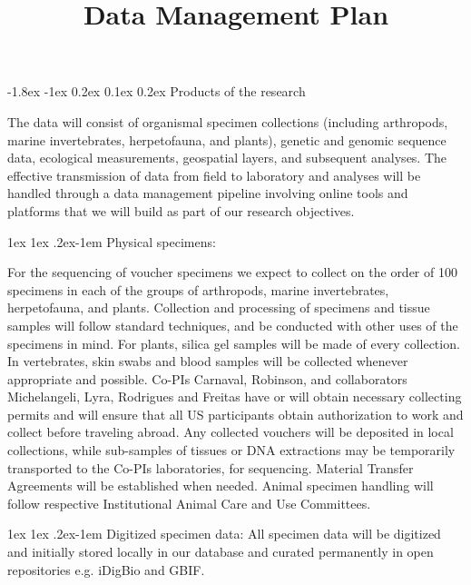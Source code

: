 \documentclass[11pt]{article}
\title{Data Management Plan \vspace{-1.5ex}}
\author{}
\date{}
\makeatletter
\renewcommand\section{\@startsection{section}{1}{\z@}%
                                  {-1.8ex \@plus -1ex \@minus 0.2ex}%
                                  {0.1ex \@plus 0.2ex}%
                                  {\normalfont\Large\bfseries}}
\renewcommand{\paragraph}{\@startsection{paragraph}{4}{\z@}
  {1ex \@plus 1ex \@minus .2ex}{-1em}
  {\normalfont\normalsize\bf}
}
\makeatother
\begin{document}
\maketitle
\vspace{-6em}

\section{Products of the research} 

The data will consist of organismal specimen collections (including arthropods, marine invertebrates, herpetofauna, and plants), genetic and genomic sequence data, ecological measurements, geospatial layers, and subsequent analyses. The effective transmission of data from field to laboratory and analyses will be handled through a data management pipeline involving online tools and platforms that we will build as part of our research objectives.

\paragraph{Physical specimens:} 

For the sequencing of voucher specimens we expect to collect on the order of 100 specimens in each of the groups of arthropods, marine invertebrates, herpetofauna, and plants.  Collection and processing of specimens and tissue samples will follow standard techniques, and be conducted with other uses of the specimens in mind.  For plants, silica gel samples will be made of every collection. In vertebrates, skin swabs and blood samples will be collected whenever appropriate and possible. Co-PIs Carnaval, Robinson, and collaborators Michelangeli, Lyra, Rodrigues and Freitas have or will obtain necessary collecting permits and will ensure that all US participants obtain authorization to work and collect before traveling abroad. Any collected vouchers will be deposited in local collections, while sub-samples of tissues or DNA extractions may be temporarily transported to the Co-PIs laboratories, for sequencing. Material Transfer Agreements will be established when needed. Animal specimen handling will follow respective Institutional Animal Care and Use Committees.

\paragraph{Digitized specimen data:} 
All specimen data will be digitized and initially stored locally in our database and curated permanently in open repositories e.g. iDigBio and GBIF.  
\end{document}
